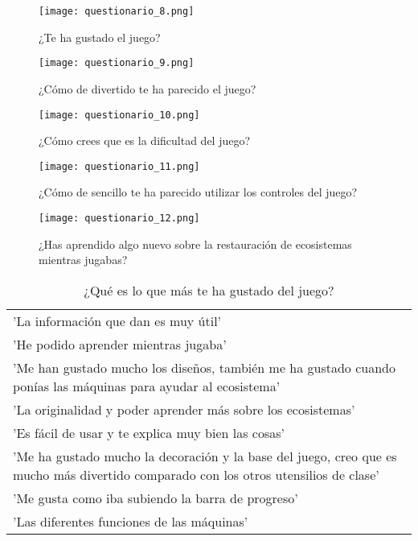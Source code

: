 \begin{figure}[H]
  \centering
  \texttt{[image: questionario\_8.png]}
  \caption{¿Te ha gustado el juego?}
  \label{fig:questionario_8}
\end{figure}
\raggedbottom

\begin{figure}[H]
  \centering
  \texttt{[image: questionario\_9.png]}
  \caption{¿Cómo de divertido te ha parecido el juego?}
  \label{fig:questionario_9}
\end{figure}
\raggedbottom

\begin{figure}[H]
  \centering
  \texttt{[image: questionario\_10.png]}
  \caption{¿Cómo crees que es la dificultad del juego?}
  \label{fig:questionario_10}
\end{figure}
\raggedbottom

\begin{figure}[H]
  \centering
  \texttt{[image: questionario\_11.png]}
  \caption{¿Cómo de sencillo te ha parecido utilizar los controles del juego?}
  \label{fig:questionario_11}
\end{figure}
\raggedbottom

\begin{figure}[H]
  \centering
  \texttt{[image: questionario\_12.png]}
  \caption{¿Has aprendido algo nuevo sobre la restauración de ecosistemas mientras jugabas?}
  \label{fig:questionario_12}
\end{figure}
\raggedbottom

\begin{table}[H]
  \begin{center}
  \setlength{\tabcolsep}{5pt}
  \renewcommand{\arraystretch}{1.2}
  \begin{tabular}{ | m{\textwidth} | } 
    \hline
    'La información que dan es muy útil' \\ 
    'He podido aprender mientras jugaba' \\ 
    'Me han gustado mucho los diseños, también me ha gustado cuando ponías las máquinas para ayudar al ecosistema' \\ 
    'La originalidad y poder aprender más sobre los ecosistemas' \\ 
    'Es fácil de usar y te explica muy bien las cosas' \\ 
    'Me ha gustado mucho la decoración y la base del juego, creo que es mucho más divertido comparado con los otros utensilios de clase' \\ 
    'Me gusta como iba subiendo la barra de progreso' \\ 
    'Las diferentes funciones de las máquinas' \\ 
    \hline
  \end{tabular}
  \centering
  \caption{¿Qué es lo que más te ha gustado del juego?}
  \label{fig:tablaResultadosPC}
  \end{center}
\end{table}  
 
